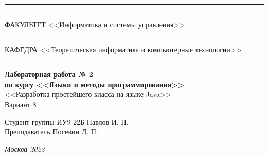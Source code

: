 \documentclass[a4paper, 14pt]{extarticle}
\begin{document}
\begin{titlepage}
\vspace{-25pt}
\hspace{-35pt}\rule{\textwidth}{2.3pt}

\vspace*{-20.3pt}
\hspace{-35pt}\rule{\textwidth}{0.4pt}

\vspace{1.5ex}
\hspace{-35pt} \noindent \small ФАКУЛЬТЕТ\hspace{80pt} <<Информатика и системы управления>>

\vspace*{-16pt}
\hspace{47pt}\rule{0.83\textwidth}{0.4pt}

\vspace{0.5ex}
\hspace{-35pt} \noindent \small КАФЕДРА\hspace{50pt} <<Теоретическая информатика и компьютерные технологии>>

\vspace*{-16pt}
\hspace{30pt}\rule{0.866\textwidth}{0.4pt}
  
\vspace{11em}

\begin{center}
\Large {\bf Лабораторная работа № 2} \\ 
\large {\bf по курсу <<Языки и методы программирования>>} \\
\large <<Разработка простейшего класса на языке Java>> \\
\large Вариант 8
\end{center}\normalsize

\vspace{8em}


\begin{flushright}
  {Студент группы ИУ9-22Б Павлов И. П. \hspace*{15pt}\\ 
  \vspace{2ex}
  Преподаватель Посевин Д. П.\hspace*{15pt}}
\end{flushright}

\bigskip

\vfill
 

\begin{center}
\textsl{Москва 2023}
\end{center}
\end{titlepage}
\end{document}
